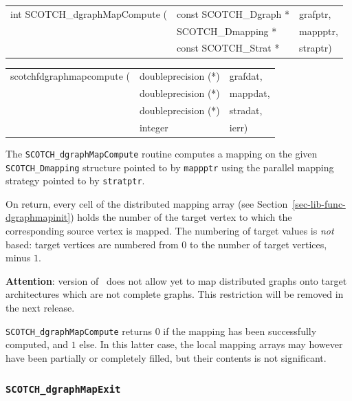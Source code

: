 \begin{itemize}
\progsyn

{\tt\begin{tabular}{l@{}ll}
int SCOTCH\_dgraphMapCompute ( & const SCOTCH\_Dgraph * & grafptr, \\
                               & SCOTCH\_Dmapping *     & mappptr, \\
                               & const SCOTCH\_Strat *  & straptr)
\end{tabular}}

{\tt\begin{tabular}{l@{}ll}
scotchfdgraphmapcompute ( & doubleprecision (*) & grafdat, \\
                          & doubleprecision (*) & mappdat, \\
                          & doubleprecision (*) & stradat, \\
                          & integer             & ierr)
\end{tabular}}

\progdes

The {\tt SCOTCH\_dgraphMapCompute} routine computes a mapping
on the given {\tt SCOTCH\_\lbt Dmapping} structure pointed
to by {\tt mappptr} using the parallel mapping strategy pointed to
by {\tt stratptr}.

On return, every cell of the distributed mapping array (see
Section~\ref{sec-lib-func-dgraphmapinit}) holds the number of the target
vertex to which the corresponding source vertex is mapped. The
numbering of target values is {\em not\/} based: target vertices are
numbered from $0$ to the number of target vertices, minus $1$.

{\bf Attention}: version {} of \scotch\ does not allow yet to
map distributed graphs onto target architectures which are not
complete graphs. This restriction will be removed in the next release.

\progret

{\tt SCOTCH\_dgraphMapCompute} returns $0$ if the mapping has been
successfully computed, and $1$ else. In this latter case, the local
mapping arrays may however have been partially or completely filled,
but their contents is not significant.
\end{itemize}

\subsubsection{{\tt SCOTCH\_dgraphMapExit}}

